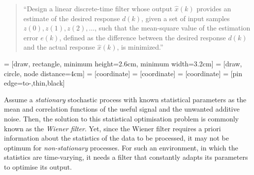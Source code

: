 \begin{quote}``Design a linear discrete-time filter whose output $\hat{x}(k)$ provides an estimate of the desired response $d(k)$, given a set of input samples $z(0), z(1), z(2), \dots$, such that the mean-square value of the estimation error $e(k)$, defined as the difference between the desired response $d(k)$ and the actual response $\hat{x}(k)$, is minimized.''
\end{quote}

 = [draw, rectangle, 
    minimum height=2.6cm, minimum width=3.2cm]
 = [draw, circle, node distance=4cm]
 = [coordinate]
 = [coordinate]
 = [coordinate]
 = [pin edge={to-,thin,black}]

\begin{figure}
\centering
{}
\end{figure}

Assume a \emph{stationary} stochastic process with known statistical parameters as the mean and correlation functions of the useful signal and the unwanted additive noise. Then, the solution to this statistical optimisation problem is commonly known as the \emph{Wiener filter}. Yet, since the Wiener filter requires a priori information about the statistics of the data to be processed, it may not be optimum for \emph{non-stationary} processes. For such an environment, in which the statistics are time-varying, it needs a filter that constantly adapts its parameters to optimise its output.

